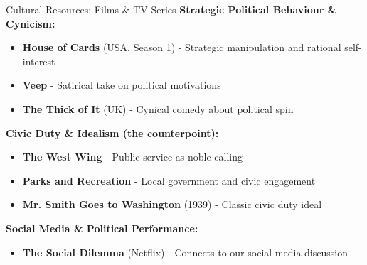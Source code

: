 \documentclass[10pt]{beamer}
\begin{document}
\begin{frame}{Cultural Resources: Films \& TV Series}
\textbf{Strategic Political Behaviour \& Cynicism:}
\begin{itemize}
\item \textbf{House of Cards} (USA, Season 1) - Strategic manipulation and rational self-interest
\item \textbf{Veep} - Satirical take on political motivations
\item \textbf{The Thick of It} (UK) - Cynical comedy about political spin
\end{itemize}



\textbf{Civic Duty \& Idealism (the counterpoint):}
\begin{itemize}
\item \textbf{The West Wing} - Public service as noble calling
\item \textbf{Parks and Recreation} - Local government and civic engagement
\item \textbf{Mr. Smith Goes to Washington} (1939) - Classic civic duty ideal
\end{itemize}



\textbf{Social Media \& Political Performance:}
\begin{itemize}
\item \textbf{The Social Dilemma} (Netflix) - Connects to our social media discussion
\end{itemize}
\end{frame}
\end{document}
